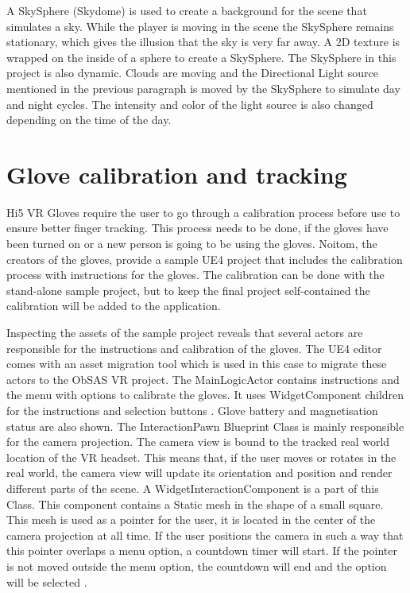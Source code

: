 \documentclass[12pt, a4paper,oneside, nocenter]{thesis}
\begin{document}
\par
A SkySphere (Skydome) is used to create a background for the scene that simulates a sky. While the player is moving in the scene the SkySphere remains stationary, which gives the illusion that the sky is very far away. A 2D texture is wrapped on the inside of a sphere to create a SkySphere. The SkySphere in this project is also dynamic. Clouds are moving and the Directional Light source mentioned in the previous paragraph is moved by the SkySphere to simulate day and night cycles. The intensity and color of the light source is also changed depending on the time of the day.
\section{Glove calibration and tracking}
Hi5 VR Gloves require the user to go through a calibration process before use to ensure better finger tracking. This process needs to be done, if the gloves have been turned on or a new person is going to be using the gloves. Noitom, the creators of the gloves, provide a sample UE4 project that includes the calibration process with instructions for the gloves. The calibration can be done with the stand-alone sample project, but to keep the final project self-contained the calibration will be added to the application.
\par
Inspecting the assets of the sample project reveals that several actors are responsible for the instructions and calibration of the gloves. The UE4 editor comes with an asset migration tool which is used in this case to migrate these actors to the ObSAS VR project. The MainLogicActor contains instructions and the menu with options to calibrate the gloves. It uses WidgetComponent children for the instructions and selection buttons . Glove battery and magnetisation status are also shown. The InteractionPawn Blueprint Class is mainly responsible for the camera projection. The camera view is bound to the tracked real world location of the VR headset. This means that, if the user moves or rotates in the real world, the camera view will update its orientation and position and render different parts of the scene. A WidgetInteractionComponent is a part of this Class. This component contains a Static mesh in the shape of a small square. This mesh is used as a pointer for the user, it is located in the center of the camera projection at all time. If the user positions the camera in such a way that this pointer overlaps a menu option, a countdown timer will start. If the pointer is not moved outside the menu option, the countdown will end and the option will be selected .
\end{document}
